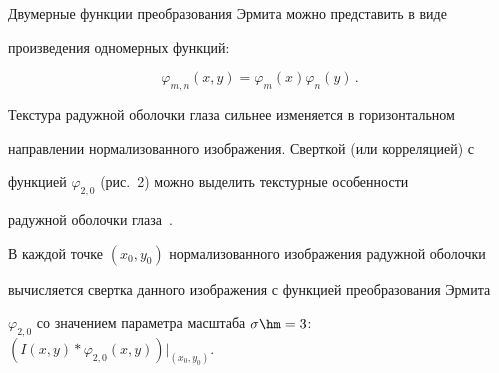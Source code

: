




Двумерные функции преобразования Эрмита можно представить в виде 


произведения одномерных функций:


$$


\varphi_{m,n}(x,y)=\varphi_m(x) \varphi_n(y)\,.


$$











Текстура радужной оболочки глаза сильнее изменяется в горизонтальном 


направлении нормализованного изображения. Сверткой (или корреляцией) с 


функцией $\varphi_{2,0}$ (рис.~2) можно выделить текстурные особенности 


радужной оболочки глаза~\cite{8-pav}.











В каждой точке $(x_0,y_0)$ нормализованного изображения радужной оболочки 


вычисляется свертка данного изображения с функцией преобразования Эрмита 


$\varphi_{2,0}$ со значением параметра масштаба $\sigma\hm=3$: $(I(x,y)* 


\varphi_{2,0}(x,y))\vert_{(x_0,y_0)}$.





